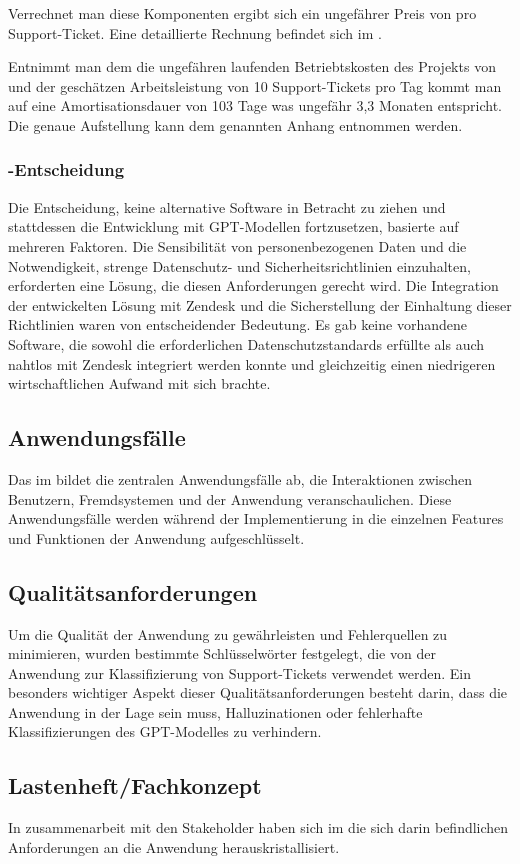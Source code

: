 Verrechnet man diese Komponenten ergibt sich ein
ungefährer Preis von  pro Support-Ticket.
Eine detaillierte Rechnung befindet sich im .

Entnimmt man dem  die ungefähren laufenden Betriebtskosten des Projekts von
 und der geschätzen Arbeitsleistung von 10 Support-Tickets pro Tag 
kommt man auf eine Amortisationsdauer von 103 Tage
was ungefähr 3,3 Monaten entspricht. 
Die genaue Aufstellung kann dem genannten Anhang entnommen werden.


\subsubsection{-Entscheidung}
\label{sec:MakeOrBuyEntscheidung}
Die Entscheidung, keine alternative Software in Betracht zu ziehen und stattdessen 
die Entwicklung mit \ac{GPT}-Modellen fortzusetzen, basierte auf mehreren Faktoren. 
Die Sensibilität von personenbezogenen Daten und die Notwendigkeit, 
strenge Datenschutz- und Sicherheitsrichtlinien 
einzuhalten, erforderten eine Lösung, die diesen Anforderungen gerecht wird.
Die Integration der entwickelten Lösung mit Zendesk und die Sicherstellung der Einhaltung 
dieser Richtlinien waren von entscheidender Bedeutung. 
Es gab keine vorhandene Software, die sowohl die erforderlichen Datenschutzstandards 
erfüllte als auch nahtlos mit Zendesk integriert werden konnte
und gleichzeitig einen niedrigeren wirtschaftlichen Aufwand mit sich brachte.


\subsection{Anwendungsfälle}
\label{sec:Anwendungsfaelle}
Das im  bildet 
die zentralen Anwendungsfälle ab, die 
Interaktionen zwischen Benutzern, Fremdsystemen und der Anwendung veranschaulichen. 
Diese Anwendungsfälle werden während der Implementierung in die einzelnen 
Features und Funktionen der Anwendung aufgeschlüsselt.


\subsection{Qualitätsanforderungen}
\label{sec:Qualitaetsanforderungen}
Um die Qualität der Anwendung zu gewährleisten und Fehlerquellen zu minimieren,
wurden bestimmte Schlüsselwörter festgelegt, die von der Anwendung zur
Klassifizierung von Support-Tickets verwendet werden.
Ein besonders wichtiger Aspekt dieser Qualitätsanforderungen besteht darin, 
dass die Anwendung in der Lage sein muss, Halluzinationen oder 
fehlerhafte Klassifizierungen des \ac{GPT}-Modelles zu verhindern. 


\subsection{Lastenheft/Fachkonzept}
In zusammenarbeit mit den Stakeholder haben sich im  
die sich darin befindlichen Anforderungen an die Anwendung herauskristallisiert.
\clearpage
